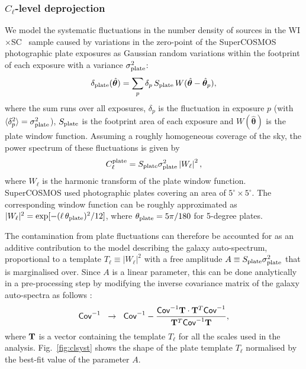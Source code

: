 \documentclass[useAMS,usenatbib]{mn2e}
\newcommand{\nv}{\hat{\boldsymbol{\theta}}}
\newcommand{\wisc}{WI$\times$SC}
\begin{document}
    \subsubsection{$C_\ell$-level deprojection}\label{sssec:methods.syst.plates}
      We model the systematic fluctuations in the number density of sources in the \wisc~ sample caused by variations in the zero-point of the SuperCOSMOS photographic plate exposures as Gaussian random variations within the footprint of each exposure with a variance $\sigma^2_{\rm plate}$:
      \begin{equation}
        \delta_{\rm plate}(\nv) = \sum_p \delta_p\,S_{\rm plate}\,W(\nv-\nv_p),
      \end{equation}
      where the sum runs over all exposures, $\delta_p$ is the fluctuation in exposure $p$ (with $\langle\delta_p^2\rangle=\sigma^2_{\rm plate}$), $S_{\rm plate}$ is the footprint area of each exposure and $W(\nv)$ is the plate window function. Assuming a roughly homogeneous coverage of the sky, the power spectrum of these fluctuations is given by
      \begin{equation}
        C_\ell^{\rm plate}=S_{\rm plate}\sigma_{\rm plate}^2\left|W_\ell\right|^2,
      \end{equation}
      where $W_\ell$ is the harmonic transform of the plate window function. SuperCOSMOS used photographic plates covering an area of $5^\circ\times5^\circ$. The corresponding window function can be roughly approximated as $|W_\ell|^2=\exp[-(\ell\,\theta_{\rm plate})^2/12]$, where $\theta_{\rm plate}=5\pi/180$ for 5-degree plates.
      
      The contamination from plate fluctuations can therefore be accounted for as an additive contribution to the model describing the galaxy auto-spectrum, proportional to a template $T_\ell\equiv|W_\ell|^2$ with a free amplitude $A\equiv S_{\rm plate}\sigma_{\rm plate}^2$ that is marginalised over. Since $A$ is a linear parameter, this can be done analytically in a pre-processing step by modifying the inverse covariance matrix of the galaxy auto-spectra as follows \citep{1992ApJ...398..169R}:
      \begin{equation}
        {\sf Cov}^{-1}\hspace{6pt}\rightarrow\hspace{6pt} {\sf Cov}^{-1}-\frac{{\sf Cov}^{-1}{\bf T}\cdot{\bf T}^T{\sf Cov}^{-1}}{{\bf T}^T{\sf Cov}^{-1}{\bf T}},
      \end{equation}
      where ${\bf T}$ is a vector containing the template $T_\ell$ for all the scales used in the analysis. Fig.\!~\ref{fig:clsyst} shows the shape of the plate template $T_\ell$ normalised by the best-fit value of the parameter $A$.
\end{document}
